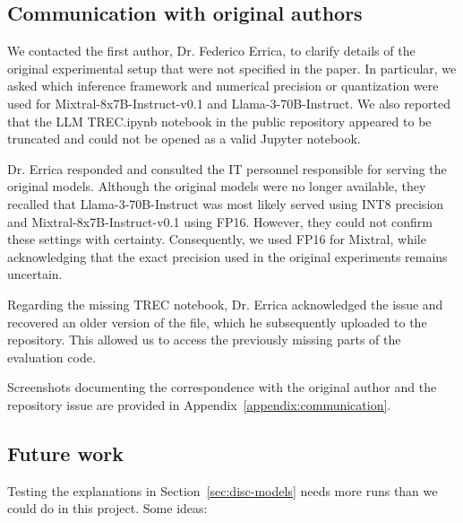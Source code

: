 \subsection{Communication with original authors}
We contacted the first author, Dr. Federico Errica, to clarify details of the original experimental setup that were not specified in the paper. In particular, we asked which inference framework and numerical precision or quantization were used for Mixtral-8x7B-Instruct-v0.1 and Llama-3-70B-Instruct. We also reported that the LLM TREC.ipynb notebook in the public repository appeared to be truncated and could not be opened as a valid Jupyter notebook.  

\par\medskip

Dr. Errica responded and consulted the IT personnel responsible for serving the original models. Although the original models were no longer available, they recalled that Llama-3-70B-Instruct was most likely served using INT8 precision and Mixtral-8x7B-Instruct-v0.1 using FP16. However, they could not confirm these settings with certainty. Consequently, we used FP16 for Mixtral, while acknowledging that the exact precision used in the original experiments remains uncertain. 

\par\medskip

Regarding the missing TREC notebook, Dr. Errica acknowledged the issue and recovered an older version of the file, which he subsequently uploaded to the repository. This allowed us to access the previously missing parts of the evaluation code.

\par\medskip

Screenshots documenting the correspondence with the original author
and the repository issue are provided in Appendix~\ref{appendix:communication}.

\subsection{Future work}
\label{sec:future-work}
Testing the explanations in Section~\ref{sec:disc-models} needs more runs
than we could do in this project. Some ideas:

